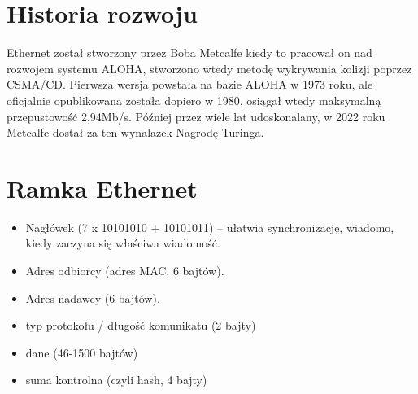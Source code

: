 \section{Historia rozwoju}
Ethernet został stworzony przez Boba Metcalfe kiedy to pracował on nad rozwojem systemu ALOHA, stworzono wtedy metodę wykrywania kolizji poprzez CSMA/CD. Pierwsza wersja powstała na bazie ALOHA w 1973 roku, ale oficjalnie opublikowana została dopiero w 1980, osiągał wtedy maksymalną przepustowość 2,94Mb/s. Później przez wiele lat udoskonalany, w 2022 roku Metcalfe dostał za ten wynalazek Nagrodę Turinga.

\section{Ramka Ethernet}
\begin{itemize}
	\item Nagłówek (7 x 10101010 + 10101011) -- ułatwia synchronizację, wiadomo, kiedy zaczyna się właściwa wiadomość.
	\item Adres odbiorcy (adres MAC, 6 bajtów).
	\item Adres nadawcy (6 bajtów).
	\item typ protokołu / długość komunikatu (2 bajty)
	\item dane (46-1500 bajtów)
	\item suma kontrolna (czyli hash, 4 bajty)
\end{itemize}

